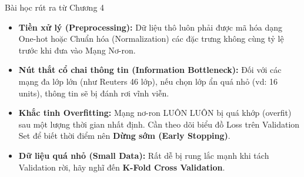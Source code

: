 \documentclass[aspectratio=169]{beamer}
\begin{document}
\begin{frame}{Bài học rút ra từ Chương 4}
    \begin{itemize}
        \item \textbf{Tiền xử lý (Preprocessing):} Dữ liệu thô luôn phải được mã hóa dạng One-hot hoặc Chuẩn hóa (Normalization) các đặc trưng không cùng tỷ lệ trước khi đưa vào Mạng Nơ-ron.
        \item \textbf{Nút thắt cổ chai thông tin (Information Bottleneck):} Đối với các mạng đa lớp lớn (như Reuters 46 lớp), nếu chọn lớp ẩn quá nhỏ (vd: 16 units), thông tin sẽ bị đánh rơi vĩnh viễn.
        \item \textbf{Khắc tinh Overfitting:} Mạng nơ-ron LUÔN LUÔN bị quá khớp (overfit) sau một lượng thời gian nhất định. Cần theo dõi biểu đồ Loss trên Validation Set để biết thời điểm nên \textbf{Dừng sớm (Early Stopping)}.
        \item \textbf{Dữ liệu quá nhỏ (Small Data):} Rất dễ bị rung lắc mạnh khi tách Validation rời, hãy nghĩ đến \textbf{K-Fold Cross Validation}.
    \end{itemize}
\end{frame}
\end{document}
